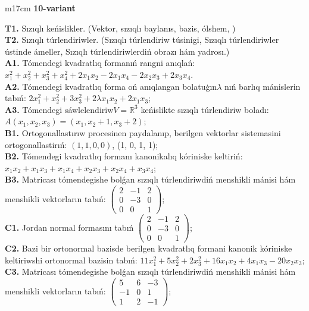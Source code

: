 \documentclass{article}
\begin{document}
\begin{tabular}{m{17cm}}
\end{tabular}
\vspace{1cm}


\begin{tabular}{m{17cm}}
\textbf{10-variant}
\newline

\textbf{T1.} Sızıqlı keńislikler.   (Vektor,  sızıqlı baylanıs, bazis, ólshem, )  \\
\textbf{T2.} Sızıqlı túrlendiriwler.  (Sızıqlı túrlendiriw túsinigi, Sızıqlı túrlendiriwler ústinde ámeller, Sızıqlı túrlendiriwlerdiń obrazı hám yadrosı.) \\
\textbf{A1.} Tómendegi kvadratlıq formanıń rangni anıqlań: \(x_{1}^{2} + x_{2}^{2} + x_{3}^{2} + x_{4}^{2} + 2x_{1}x_{2} - 2x_{1}x_{4} - 2x_{2}x_{3} + 2x_{3}x_{4}\). \\
\textbf{A2.} Tómendegi kvadratlıq forma oń anıqlangan bolatuģın\(\lambda\) nıń barlıq mánislerin tabıń: \(2x_{1}^{2} + x_{2}^{2} + 3x_{3}^{2} + 2\lambda x_{1}x_{2} + 2x_{1}x_{3}\); \\
\textbf{A3.} Tómendegi sáwlelendiriw\(V = \mathbb{R}^{3}\) keńislikte sızıqlı túrlendiriw boladı: \(A\left( x_{1},x_{2},x_{3} \right) = \left( x_{1},x_{2} + 1,x_{3} + 2 \right)\); \\
\textbf{B1.} Ortogonallastırıw procesinen paydalanıp, berilgen vektorlar sistemasini ortogonallastirıń: \((1,1,0,0)\), (1, 0, 1, 1); \\
\textbf{B2.} Tómendegi kvadratlıq formanı kanonikalıq kóriniske keltiriń: \(x_{1}x_{2} + x_{1}x_{3} + x_{1}x_{4} + x_{2}x_{3} + x_{2}x_{4} + x_{3}x_{4}\); \\
\textbf{B3.} Matricası tómendegishe bolǵan sızıqlı túrlendiriwdiń menshikli mánisi hám menshikli vektorların tabıń: \(\begin{pmatrix} 2 & - 1 & 2 \\ 0 & - 3 & 0 \\ 0 & 0 & 1 \end{pmatrix}\); \\
\textbf{C1.} Jordan normal formasını tabıń \(\begin{pmatrix} 2 & - 1 & 2 \\ 0 & - 3 & 0 \\ 0 & 0 & 1 \end{pmatrix}\); \\
\textbf{C2.} Bazi bir ortonormal bazisde berilgen kvadratlıq formani kanonik kóriniske keltiriwshi ortonormal bazisin tabıń: \(11x_{1}^{2} + 5x_{2}^{2} + 2x_{3}^{2} + 16x_{1}x_{2} + 4x_{1}x_{3} - 20x_{2}x_{3}\); \\
\textbf{C3.} Matricası tómendegishe bolǵan sızıqlı túrlendiriwdiń menshikli mánisi hám menshikli vektorların tabıń: \(\begin{pmatrix} 5 & 6 & - 3 \\  - 1 & 0 & 1 \\ 1 & 2 & - 1 \end{pmatrix}\); \\

\end{tabular}
\vspace{1cm}
\end{document}

